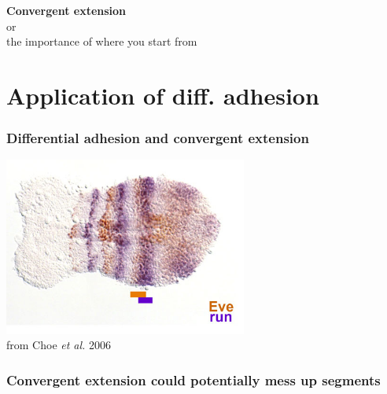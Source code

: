 \documentclass[compress]{beamer}
\begin{document}
\begin{frame}[plain]
\begin{center}
 \textbf{Convergent extension}\\
 or\\
 the importance of where you start from
\end{center}
\end{frame}

\section{Application of diff. adhesion}
\begin{frame}
\frametitle{Differential adhesion and convergent extension}  
\begin{center}
 \includegraphics[width=0.6\textwidth]{figures/tribolium_eve_run.jpg}\\
 \tiny from Choe \textit{et al.} 2006
\end{center}

\end{frame}

\begin{frame}
\frametitle{Convergent extension could potentially mess up segments}   
\begin{center}
 \\
\end{center}
\end{frame}
\end{document}
